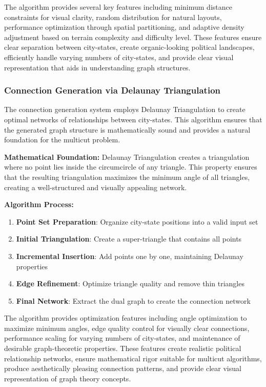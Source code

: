 \documentclass[english]{tudscrreprt}
\begin{document}
The algorithm provides several key features including minimum distance constraints for visual clarity, random distribution for natural layouts, performance optimization through spatial partitioning, and adaptive density adjustment based on terrain complexity and difficulty level. These features ensure clear separation between city-states, create organic-looking political landscapes, efficiently handle varying numbers of city-states, and provide clear visual representation that aids in understanding graph structures.

\subsubsection{Connection Generation via Delaunay Triangulation}
The connection generation system employs Delaunay Triangulation to create optimal networks of relationships between city-states. This algorithm ensures that the generated graph structure is mathematically sound and provides a natural foundation for the multicut problem.

\textbf{Mathematical Foundation:}
Delaunay Triangulation creates a triangulation where no point lies inside the circumcircle of any triangle. This property ensures that the resulting triangulation maximizes the minimum angle of all triangles, creating a well-structured and visually appealing network.

\textbf{Algorithm Process:}
\begin{enumerate}
  \item \textbf{Point Set Preparation}: Organize city-state positions into a valid input set
  \item \textbf{Initial Triangulation}: Create a super-triangle that contains all points
  \item \textbf{Incremental Insertion}: Add points one by one, maintaining Delaunay properties
  \item \textbf{Edge Refinement}: Optimize triangle quality and remove thin triangles
  \item \textbf{Final Network}: Extract the dual graph to create the connection network
\end{enumerate}



The algorithm provides optimization features including angle optimization to maximize minimum angles, edge quality control for visually clear connections, performance scaling for varying numbers of city-states, and maintenance of desirable graph-theoretic properties. These features create realistic political relationship networks, ensure mathematical rigor suitable for multicut algorithms, produce aesthetically pleasing connection patterns, and provide clear visual representation of graph theory concepts.
\end{document}
